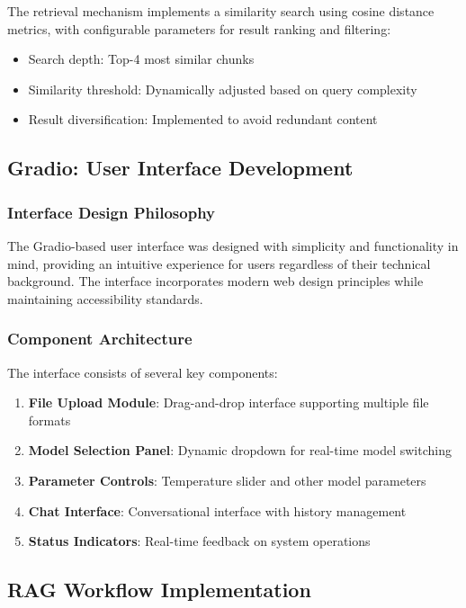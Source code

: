 \documentclass[12pt,letterpaper]{article}
\begin{document}
The retrieval mechanism implements a similarity search using cosine distance metrics, with configurable parameters for result ranking and filtering:

\begin{itemize}
    \item Search depth: Top-4 most similar chunks
    \item Similarity threshold: Dynamically adjusted based on query complexity
    \item Result diversification: Implemented to avoid redundant content
\end{itemize}

\subsection{Gradio: User Interface Development}

\subsubsection{Interface Design Philosophy}

The Gradio-based user interface was designed with simplicity and functionality in mind, providing an intuitive experience for users regardless of their technical background. The interface incorporates modern web design principles while maintaining accessibility standards.

\subsubsection{Component Architecture}

The interface consists of several key components:

\begin{enumerate}
    \item \textbf{File Upload Module}: Drag-and-drop interface supporting multiple file formats
    \item \textbf{Model Selection Panel}: Dynamic dropdown for real-time model switching
    \item \textbf{Parameter Controls}: Temperature slider and other model parameters
    \item \textbf{Chat Interface}: Conversational interface with history management
    \item \textbf{Status Indicators}: Real-time feedback on system operations
\end{enumerate}

\subsection{RAG Workflow Implementation}
\end{document}
